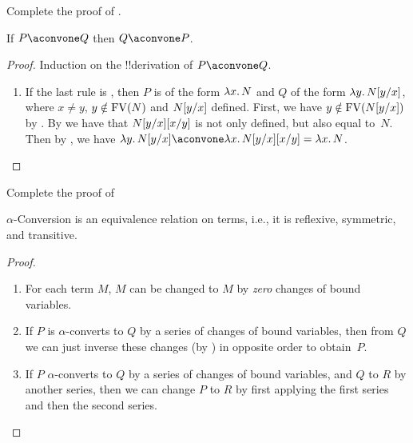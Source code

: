 \documentclass[../../../include/open-logic-section]{subfiles}
\begin{document}
\begin{prob}
  Complete the proof of .
\end{prob}

\begin{lem}
  If $P \aconvone Q$ then $Q \aconvone P$.
\end{lem}

\begin{proof}
  Induction on the !!{derivation} of $P \aconvone Q$.
  \begin{enumerate}
  \item If the last rule is , then $P$ is of the
    form $\lambd[x][N]$ and $Q$ of the form
    $\lambd[y][\Subst{N}{y}{x}]$, where $x \neq y$, $y \notin \mathrm{FV}({N})$
    and $N[y/x]$ defined. First, we have $y \notin
    \mathrm{FV}({N[y/x]})$ by . By
     we have that $N[y/x][x/y]$ is
    not only defined, but also equal to~$N$. Then by
    , we have $\lambd[y][\Subst{N}{y}{x}]
    \aconvone \lambd[x][\Subst{\Subst{N}{y}{x}}{x}{y}] =
    \lambd[x][N]$.
  \end{enumerate}
\end{proof}

\begin{prob}
  Complete the proof of 
\end{prob}

\begin{thm}
  $\alpha$-Conversion is an equivalence relation on terms, i.e., it is
  reflexive, symmetric, and transitive.
\end{thm}

\begin{proof}
  \begin{enumerate}
  \item For each term $M$, $M$ can be changed to $M$ by
    \emph{zero} changes of bound variables.
  \item If $P$ is $\alpha$-converts to $Q$ by a series of changes
    of bound variables, then from $Q$ we can just inverse these
    changes (by ) in
    opposite order to obtain~$P$.
  \item If $P$ $\alpha$-converts to $Q$ by a series of changes of
    bound variables, and $Q$ to $R$ by another series, then we can
    change $P$ to $R$ by first applying the first series and then the
    second series.
  \end{enumerate}
\end{proof}
\end{document}
